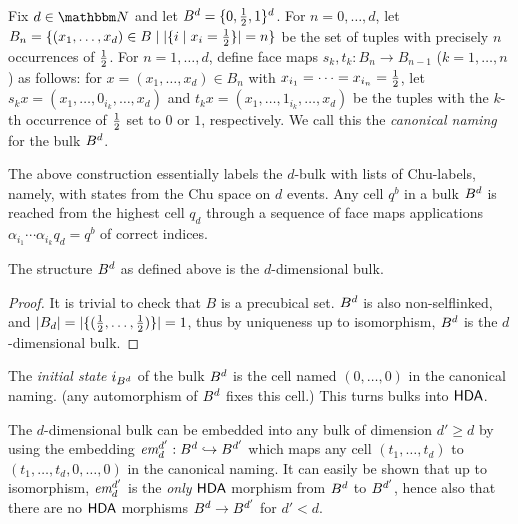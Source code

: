     \begin{definition}
    \label{def:canonical-naming}
        Fix $d\in \Nat$ and let $B^{d}= \{ 0, \frac{1}{2}, 1\}^d$. For $n= 0,\dotsc, d$, let $B_n=\{( x_1,\dotsc, x_d)\in B\mid | \{ i\mid x_i= \frac{1}{2}\}|= n\}$ be the set of tuples with precisely $n$ occurrences of $\frac{1}{2}$.  For $n= 1,\dotsc, d$, define face maps $s_k, t_k: B_n\to B_{ n- 1}$ ($k= 1,\dotsc, n$) as follows: for $x=( x_1,\dotsc, x_d)\in B_n$ with $x_{ i_1}=\dotsm= x_{ i_n}= \frac{1}{2}$, let $s_k x=( x_1,\dotsc, 0_{ i_k},\dotsc, x_d)$ and $t_k x=( x_1,\dotsc, 1_{ i_k},\dotsc, x_d)$ be the tuples with the $k$-th occurrence of $\frac{1}{2}$ set to $0$ or $1$, respectively. We call this the \emph{canonical naming} for the bulk $B^{d}$.
    \end{definition}

    The above construction essentially labels the $d$-bulk with lists of Chu-labels, namely, with states from the Chu space on $d$ events. Any cell $q^{b}$ in a bulk $B^{d}$ is reached from the highest cell $q_{d}$ through a sequence of face maps applications $\alpha_{i_{1}}\dotsm \alpha_{i_{k}}q_{d}=q^{b}$ of correct indices. 

    \begin{lemma}
        \label{lemma:chu-labelling-bulk}
        The structure $B^{d}$ as defined above is the $d$-dimensional bulk.
    \end{lemma}

    \begin{proof}
        It is trivial to check that $B$ is a precubical set.  $B^{d}$ is also non-selflinked, and $|  B_d|= | \{( \frac{1}{2},\dotsc, \frac{1}{2})\}|= 1$, thus by uniqueness up to isomorphism, $B^{d}$ is the $d$-dimensional bulk.
    \end{proof}

    The \emph{initial state} $i_{ B^{d}}$ of the bulk $B^{d}$ is the cell named $( 0,\dotsc, 0)$ in the canonical naming.  (any automorphism of $B^{d}$ fixes this cell.)  This turns bulks into $\text{\textup{\textsf{HDA}}}$.

    The $d$-dimensional bulk can be embedded into any bulk of dimension $d'\ge d$ by using the embedding $\textit{em}^{d'}_{d}:B^{d}\hookrightarrow B^{d'}$ which maps any cell $( t_1,\dotsc, t_d)$ to $( t_1,\dotsc, t_d, 0,\dotsc, 0)$ in the canonical naming.  It can easily be shown that up to isomorphism, $\textit{em}^{ d'}_d$ is the \emph{only} $\text{\textup{\textsf{HDA}}}$ morphism from $B^{ d}$ to $B^{ d'}$, hence also that there are no $\text{\textup{\textsf{HDA}}}$ morphisms $B^{d}\to B^{d'}$ for $d'< d$.

